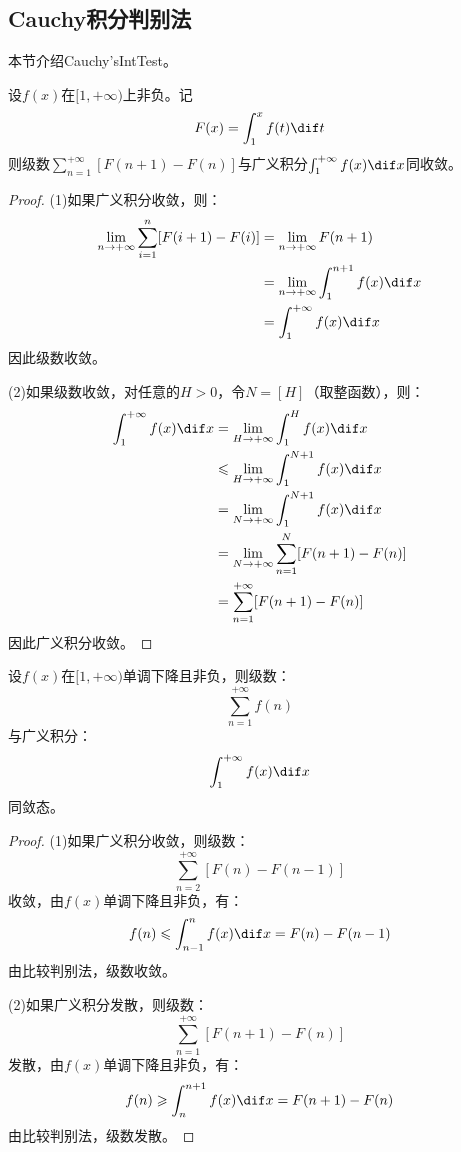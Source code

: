 \subsection{Cauchy积分判别法}
本节介绍Cauchy's\gls{IntTest}。
\begin{lemma}
	设$f(x)$在$[1,+\infty)$上非负。记
	\begin{equation*}
		F(x)=\int_1^xf(t)\dif t
	\end{equation*}
	则级数$\sum\limits_{n=1}^{+\infty}[F(n+1)-F(n)]$与广义积分$\int_1^{+\infty}f(x)\dif x$同收敛。
\end{lemma}
\begin{proof}
	(1)如果广义积分收敛，则：
	\begin{align*}
		\lim_{n\to+\infty}\sum_{i=1}^n[F(i+1)-F(i)]&=	\lim_{n\to+\infty}F(n+1) \\
		&=\lim_{n\to+\infty}\int_1^{n+1}f(x)\dif x \\
		&=\int_1^{+\infty}f(x)\dif x
	\end{align*}
	因此级数收敛。\par
	(2)如果级数收敛，对任意的$H>0$，令$N=[H]$（取整函数），则：
	\begin{align*}
		\int_1^{+\infty}f(x)\dif x
		&=\lim_{H\to+\infty}\int_1^{H}f(x)\dif x \\
		&\leqslant\lim_{H\to+\infty}\int_1^{N+1}f(x)\dif x \\
		&=\lim_{N\to+\infty}\int_1^{N+1}f(x)\dif x \\
		&=\lim_{N\to+\infty}\sum_{n=1}^{N}[F(n+1)-F(n)] \\
		&=\sum_{n=1}^{+\infty}[F(n+1)-F(n)]
	\end{align*}
	因此广义积分收敛。
\end{proof}
\begin{theorem}
	设$f(x)$在$[1,+\infty)$单调下降且非负，则级数：
	\begin{equation*}
		\sum_{n=1}^{+\infty}f(n)
	\end{equation*}
	与广义积分：
	\begin{equation*}
		\int_{1}^{+\infty}f(x)\dif x
	\end{equation*}
	同敛态。
\end{theorem}
\begin{proof}
	(1)如果广义积分收敛，则级数：
	\begin{equation*}
		\sum_{n=2}^{+\infty}[F(n)-F(n-1)]
	\end{equation*}
	收敛，由$f(x)$单调下降且非负，有：
	\begin{equation*}
		f(n)\leqslant\int_{n-1}^{n}f(x)\dif x=F(n)-F(n-1)
	\end{equation*}
	由比较判别法，级数收敛。\par
	(2)如果广义积分发散，则级数：
	\begin{equation*}
		\sum_{n=1}^{+\infty}[F(n+1)-F(n)]
	\end{equation*}
	发散，由$f(x)$单调下降且非负，有：
	\begin{equation*}
		f(n)\geqslant\int_{n}^{n+1}f(x)\dif x=F(n+1)-F(n)
	\end{equation*}
	由比较判别法，级数发散。
\end{proof}

